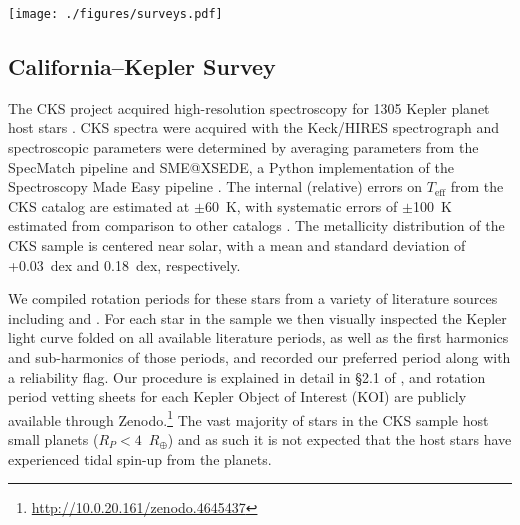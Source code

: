 \documentclass[trackchanges,twocolumn]{aastex631}
\newcommand{\jvs}{vS19\xspace}
\newcommand{\mma}{MMA14\xspace}
\newcommand{\teff}{\ensuremath{T_{\mathrm{eff}}}\xspace}
\newcommand{\rearth}{$R_\oplus$\xspace}
\newcommand{\prot}{\ensuremath{P_\mathrm{rot}}\xspace}
\begin{document}
\begin{figure*}
    \centering
    \texttt{[image: ./figures/surveys.pdf]}
    \caption{The \teff-\prot plane using rotation periods from \mma or, in the case of the CKS sample, \citet{McQuillan2013} which applied an identical analysis to Kepler Objects of Interest (KOIs), with \teff originating from the source denoted at top. The \mma \teff values originate from the Kepler Input Catalog \citep[KIC,][]{Brown2011} or \citet{Dressing2013} for low-mass stars. The orange point in each panel indicates the Sun's equatorial rotation period, with the errorbar capturing the range of periods measured from the activity belts. Many of the stars above the long-period pileup are subgiants which have experienced spin-down due to expansion off the main-sequence, as pointed out in \jvs.}
    \label{fig:surveys}
\end{figure*}

\subsection{California--Kepler Survey} \label{subsec:cks}
The CKS project acquired high-resolution spectroscopy for 1305 Kepler planet host stars \citep{Petigura2017}. CKS spectra were acquired with the Keck/HIRES spectrograph \citep{Vogt1994} and spectroscopic parameters were determined by averaging parameters from the SpecMatch pipeline \citep{Petigura2015} and SME@XSEDE, a Python implementation of the Spectroscopy Made Easy pipeline \citep{Valenti1996}. The internal (relative) errors on \teff from the CKS catalog are estimated at $\pm$60~K, with systematic errors of $\pm$100~K estimated from comparison to other catalogs \citep[see Table 7 of][]{Petigura2017}. The metallicity distribution of the CKS sample is centered near solar, with a mean and standard deviation of +0.03~dex and 0.18~dex, respectively.

We compiled rotation periods for these stars from a variety of literature sources including \citet{McQuillan2013, Mazeh2015} and \citet{Angus2018}. For each star in the sample we then visually inspected the Kepler light curve folded on all available literature periods, as well as the first harmonics and sub-harmonics of those periods, and recorded our preferred period along with a reliability flag. Our procedure is explained in detail in \S2.1 of \citet{David2021}, and rotation period vetting sheets for each Kepler Object of Interest (KOI) are publicly available through Zenodo.\footnote{\url{http://10.0.20.161/zenodo.4645437}} The vast majority of stars in the CKS sample host small planets ($R_P < 4$~\rearth) and as such it is not expected that the host stars have experienced tidal spin-up from the planets.
\end{document}

